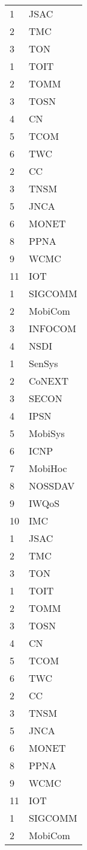 \documentclass[print, doctor, vlined]{DissertUESTC}
\begin{document}
\begin{longtable}{p{2em} p{4.5em}}
		1 & JSAC \\
		2 & TMC \\
		3 & TON \\
		1 & TOIT \\
		2 & TOMM \\
		3 & TOSN \\
		4 & CN \\
		5 & TCOM \\
		6 & TWC \\
		2 & CC \\
		3 & TNSM \\
		5 & JNCA \\
		6 & MONET \\
		8 & PPNA \\
		9 & WCMC \\
		11 & IOT \\
		1 & SIGCOMM \\
		2 & MobiCom \\
		3 & INFOCOM \\
		4 & NSDI \\
		1 & SenSys \\
		2 & CoNEXT \\
		3 & SECON \\
		4 & IPSN \\
		5 & MobiSys \\
		6 & ICNP \\
		7 & MobiHoc \\
		8 & NOSSDAV \\
		9 & IWQoS \\
		10 & IMC \\
		1 & JSAC \\
		2 & TMC \\
		3 & TON \\
		1 & TOIT \\
		2 & TOMM \\
		3 & TOSN \\
		4 & CN \\
		5 & TCOM \\
		6 & TWC \\
		2 & CC \\
		3 & TNSM \\
		5 & JNCA \\
		6 & MONET \\
		8 & PPNA \\
		9 & WCMC \\
		11 & IOT \\
		1 & SIGCOMM \\
		2 & MobiCom \\

\end{longtable}
\end{document}
